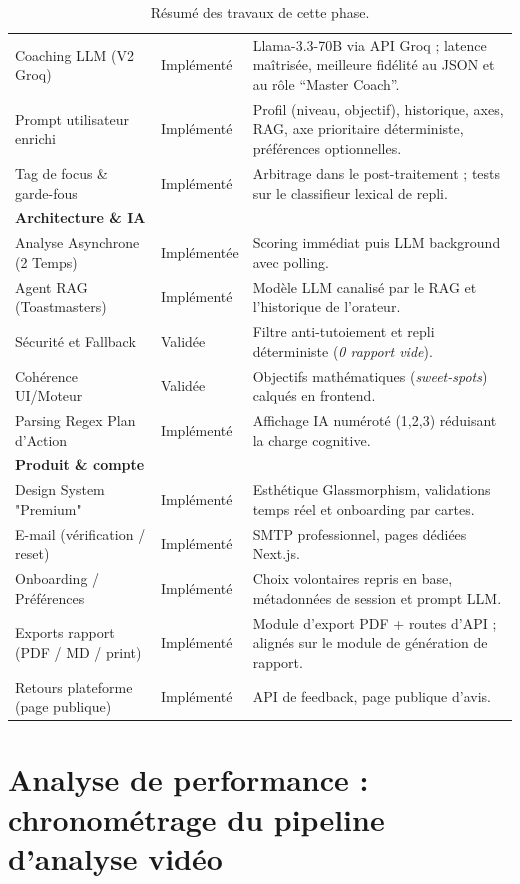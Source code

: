 ﻿\documentclass[12pt,a4paper]{article}
\begin{document}
\begin{table}[H]
\begin{tabularx}{\textwidth}{@{}p{5.4cm}p{2.5cm}X@{}}
        Coaching LLM (V2 Groq) & Implémenté & Llama-3.3-70B via API Groq ; latence maîtrisée, meilleure fidélité au JSON et au rôle ``Master Coach''. \\
        Prompt utilisateur enrichi & Implémenté & Profil (niveau, objectif), historique, axes, RAG, axe prioritaire déterministe, préférences optionnelles. \\
        Tag de focus \& garde-fous & Implémenté & Arbitrage dans le post-traitement ; tests sur le classifieur lexical de repli. \\
        \midrule
        \textbf{Architecture \& IA} & & \\
        \midrule
        Analyse Asynchrone (2 Temps) & Implémentée & Scoring immédiat puis LLM background avec polling. \\
        Agent RAG (Toastmasters) & Implémenté & Modèle LLM canalisé par le RAG et l'historique de l'orateur. \\
        Sécurité et Fallback & Validée & Filtre anti-tutoiement et repli déterministe (\textit{0 rapport vide}). \\
        Cohérence UI/Moteur & Validée & Objectifs mathématiques (\textit{sweet-spots}) calqués en frontend. \\
        Parsing Regex Plan d'Action & Implémenté & Affichage IA numéroté (1,2,3) réduisant la charge cognitive. \\
        \midrule
        \textbf{Produit \& compte} & & \\
        \midrule
        Design System "Premium" & Implémenté & Esthétique Glassmorphism, validations temps réel et onboarding par cartes. \\
        E-mail (vérification / reset) & Implémenté & SMTP professionnel, pages dédiées Next.js. \\
        Onboarding / Préférences & Implémenté & Choix volontaires repris en base, métadonnées de session et prompt LLM. \\
        Exports rapport (PDF / MD / print) & Implémenté & Module d'export PDF + routes d'API ; alignés sur le module de génération de rapport. \\
        Retours plateforme (page publique) & Implémenté & API de feedback, page publique d'avis. \\
        \bottomrule
    \end{tabularx}
    \caption{Résumé des travaux de cette phase.}
\end{table}

\section{Analyse de performance : chronométrage du pipeline d'analyse vidéo}
\label{sec:performance-analysis}
\end{document}

